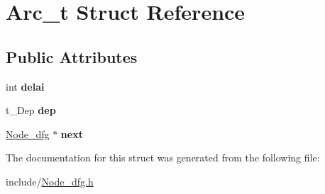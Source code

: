 \hypertarget{struct_arc__t}{}\section{Arc\+\_\+t Struct Reference}
\label{struct_arc__t}
\subsection*{Public Attributes}
\begin{DoxyCompactItemize}
\item 
\mbox{\label{struct_arc__t_a629d4a4e9c44aae452c7d54979c82abe}} 
int {\bfseries delai}
\item 
\mbox{\label{struct_arc__t_a75234bf2ed3084da0bf5b8fbc52fdc67}} 
t\+\_\+\+Dep {\bfseries dep}
\item 
\mbox{\label{struct_arc__t_af7eaf6285792517ed5f06eba6abe3211}} 
\mbox{\hyperlink{class_node__dfg}{Node\+\_\+dfg}} $\ast$ {\bfseries next}
\end{DoxyCompactItemize}


The documentation for this struct was generated from the following file\+:\begin{DoxyCompactItemize}
\item 
include/\mbox{\hyperlink{_node__dfg_8h}{Node\+\_\+dfg.\+h}}\end{DoxyCompactItemize}
